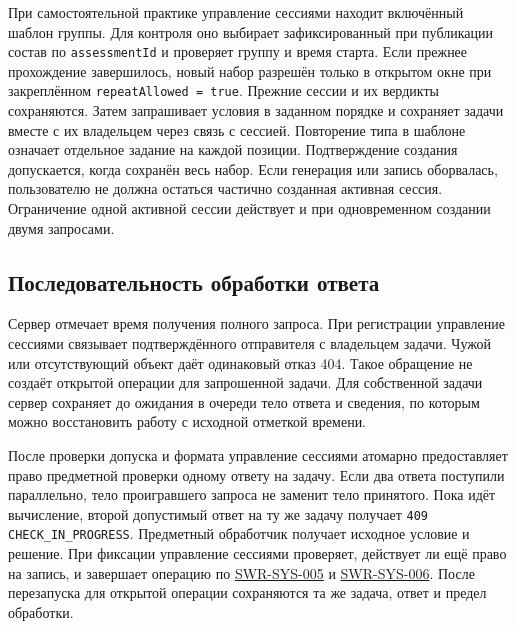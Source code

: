 \documentclass[12pt,a4paper]{article}
\begin{document}
\hypertarget{последовательность-создания-набора}{}

При самостоятельной практике управление сессиями находит включённый шаблон группы. Для контроля оно выбирает зафиксированный при публикации состав по \texttt{assessment\allowbreak{}Id} и проверяет группу и время старта. Если прежнее прохождение завершилось, новый набор разрешён только в открытом окне при закреплённом \texttt{repeat\allowbreak{}Allowed =\allowbreak{} true}. Прежние сессии и их вердикты сохраняются. Затем запрашивает условия в заданном порядке и сохраняет задачи вместе с их владельцем через связь с сессией. Повторение типа в шаблоне означает отдельное задание на каждой позиции. Подтверждение создания допускается, когда сохранён весь набор. Если генерация или запись оборвалась, пользователю не должна остаться частично созданная активная сессия. Ограничение одной активной сессии действует и при одновременном создании двумя запросами.

\subsection{Последовательность обработки ответа}\label{ux43fux43eux441ux43bux435ux434ux43eux432ux430ux442ux435ux43bux44cux43dux43eux441ux442ux44c-ux43eux431ux440ux430ux431ux43eux442ux43aux438-ux43eux442ux432ux435ux442ux430}

\hypertarget{последовательность-обработки-ответа}{}

Сервер отмечает время получения полного запроса. При регистрации управление сессиями связывает подтверждённого отправителя с владельцем задачи. Чужой или отсутствующий объект даёт одинаковый отказ 404. Такое обращение не создаёт открытой операции для запрошенной задачи. Для собственной задачи сервер сохраняет до ожидания в очереди тело ответа и сведения, по которым можно восстановить работу с исходной отметкой времени.

После проверки допуска и формата управление сессиями атомарно предоставляет право предметной проверки одному ответу на задачу. Если два ответа поступили параллельно, тело проигравшего запроса не заменит тело принятого. Пока идёт вычисление, второй допустимый ответ на ту же задачу получает \texttt{409 CHECK\_\allowbreak{}IN\_\allowbreak{}PROGRESS}. Предметный обработчик получает исходное условие и решение. При фиксации управление сессиями проверяет, действует ли ещё право на запись, и завершает операцию по {\hyperlink{swr-sys-005}{SWR-SYS-005}} и {\hyperlink{swr-sys-006}{SWR-SYS-006}}. После перезапуска для открытой операции сохраняются та же задача, ответ и предел обработки.
\end{document}
